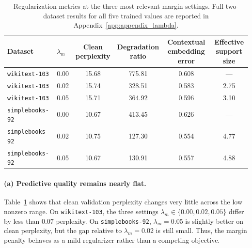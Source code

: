 \documentclass[11pt]{article}
\begin{document}
\begin{table}[H]
\centering
\caption{Regularization metrics at the three most relevant margin settings.
Full two-dataset results for all five trained values are reported in
Appendix~\ref{app:appendix_lambda}.}
\label{tab:lambda_sweep}
\small
\begin{tabular}{llcccc}
\toprule
\shortstack[c]{\textbf{Dataset}\\\mbox{}} & \shortstack[c]{\textbf{$\lambda_m$}\\\mbox{}} & \shortstack[c]{\strut\textbf{Clean}\\\textbf{perplexity}\strut} & \shortstack[c]{\strut\textbf{Degradation}\\\textbf{ratio}\strut} & \shortstack[c]{\strut\textbf{Contextual}\\\textbf{embedding error}\strut} & \shortstack[c]{\strut\textbf{Effective}\\\textbf{support size}\strut} \\
\midrule
\texttt{wikitext-103} & 0.00 & 15.68 & 775.81 & 0.608 & --- \\
\texttt{wikitext-103} & 0.02 & 15.74 & 328.51 & 0.583 & 2.75 \\
\texttt{wikitext-103} & 0.05 & 15.71 & 364.92 & 0.596 & 3.10 \\
\addlinespace[2pt]
\texttt{simplebooks-92} & 0.00 & 10.67 & 413.45 & 0.626 & --- \\
\texttt{simplebooks-92} & 0.02 & 10.75 & 127.30 & 0.554 & 4.77 \\
\texttt{simplebooks-92} & 0.05 & 10.67 & 130.91 & 0.557 & 4.88 \\
\bottomrule
\end{tabular}
\end{table}

\paragraph{(a) Predictive quality remains nearly flat.}
Table~\ref{tab:lambda_sweep} shows that clean validation perplexity changes
very little across the low nonzero range. On \texttt{wikitext-103}, the three
settings $\lambda_m \in \{0.00, 0.02, 0.05\}$ differ by less than
$0.07$ perplexity. On \texttt{simplebooks-92}, $\lambda_m{=}0.05$ is slightly
better on clean perplexity, but the gap relative to $\lambda_m{=}0.02$ is still small.
Thus, the margin penalty behaves as a mild regularizer rather than a competing objective.
\end{document}
